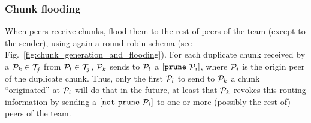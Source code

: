\begin{comment}
The round-time is defined by:
\begin{equation}
  \cal{r} = \cal{c}N.
  \label{eq:round_time}
\end{equation}
For example, if we use only one team of $N=256$ peers, a chunk size
$C=1024$~bytes, and a video of $1$~Mb/s, the round time is
\begin{displaymath}
  \cal{r} = \frac{1024\frac{\text{bytes}}{\text{chunk}}\times
    8\frac{\text{bits}}{\text{byte}}}{10^6\frac{\text{bits}}{\text{second}}}\times
  256 \approx 2.1~\text{seconds}.
\end{displaymath}
\end{comment}

\subsubsection{Chunk flooding}
\label{dbs:chunk_flooding}
When peers receive chunks, flood them to the rest of peers of the team
(except to the sender), using again a round-robin schema (see
Fig.~\ref{fig:chunk_generation_and_flooding}). For each duplicate
chunk received by a ${\cal P}_k \in {\cal T}_j$ from ${\cal P}_l \in
{\cal T}_j$, ${\cal P}_k$ sends to ${\cal P}_l$ a
$[\mathtt{prune}~{\cal P}_i]$, where ${\cal P}_i$ is the origin peer
of the duplicate chunk. Thus, only the first ${\cal P}_l$ to send to
${\cal P}_k$ a chunk ``originated'' at ${\cal P}_i$ will do that in
the future, at least that ${\cal P}_k$ revokes this routing
information by sending a $[\mathtt{not~prune}~{\cal P}_i]$ to one or
more (possibly the rest of) peers of the team.



